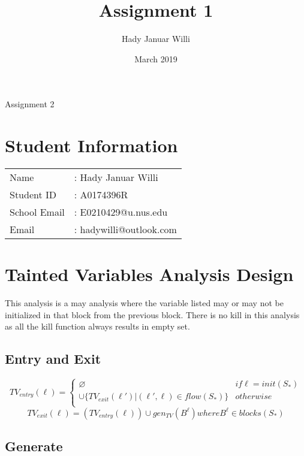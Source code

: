 \documentclass[11pt,a4paper,fleqn]{article}
\title{Assignment 1}
\author{Hady Januar Willi}
\date{March 2019}
\begin{document}
   \begin{center}
      \LARGE Assignment 2
   \end{center}
   \section{Student Information}

   \begin{tabular}{l l} 
      Name           & : Hady Januar Willi      \\ 
      Student ID     & : A0174396R              \\
      School Email   & : E0210429@u.nus.edu     \\
      Email          & : hadywilli@outlook.com  \\
   \end{tabular}
   
   \section{Tainted Variables Analysis Design}

   This analysis is a may analysis where the variable listed may or may not be initialized in that block from the previous block. 
   There is no kill in this analysis as all the kill function always results in empty set.

   \subsection{Entry and Exit}

   \begin{equation}
      TV_{entry}(\ell)=
      \begin{cases} 
         \varnothing & if \ell = init(S_*) \\ 
         \cup \{ TV_{exit}(\ell')|(\ell',\ell) \in flow(S_*) \} & otherwise \\   
      \end{cases}
   \end{equation}
   \begin{equation}
      TV_{exit}(\ell)=(TV_{entry}(\ell)) \cup gen_{TV}(B^{\ell}) where B^{\ell} \in blocks(S_*)
   \end{equation}
   
   \subsection{Generate}
\end{document}
